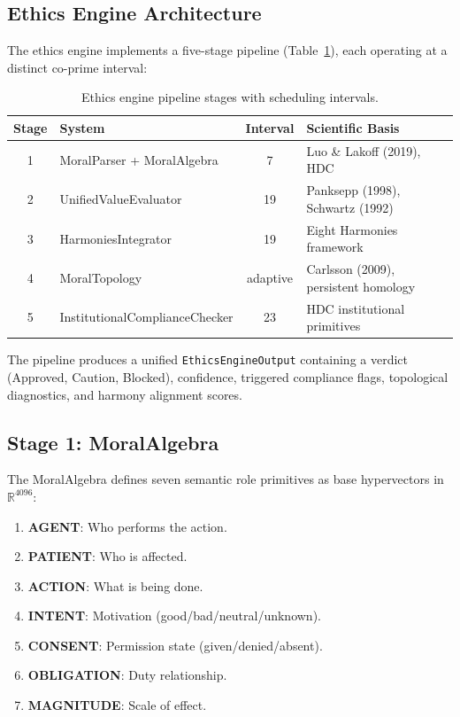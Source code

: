 \documentclass[11pt,a4paper]{article}
\begin{document}
\subsection{Ethics Engine Architecture}

The ethics engine implements a five-stage pipeline (Table~\ref{tab:pipeline}), each operating at a distinct co-prime interval:

\begin{table}[h]
\centering
\caption{Ethics engine pipeline stages with scheduling intervals.}
\label{tab:pipeline}
\begin{tabular}{clcl}
\toprule
\textbf{Stage} & \textbf{System} & \textbf{Interval} & \textbf{Scientific Basis} \\
\midrule
1 & MoralParser + MoralAlgebra & 7 & Luo \& Lakoff (2019), HDC \\
2 & UnifiedValueEvaluator & 19 & Panksepp (1998), Schwartz (1992) \\
3 & HarmoniesIntegrator & 19 & Eight Harmonies framework \\
4 & MoralTopology & adaptive & Carlsson (2009), persistent homology \\
5 & InstitutionalComplianceChecker & 23 & HDC institutional primitives \\
\bottomrule
\end{tabular}
\end{table}

The pipeline produces a unified \texttt{EthicsEngineOutput} containing a verdict (Approved, Caution, Blocked), confidence, triggered compliance flags, topological diagnostics, and harmony alignment scores.

\subsection{Stage 1: MoralAlgebra}

The MoralAlgebra defines seven semantic role primitives as base hypervectors in $\mathbb{R}^{4096}$:

\begin{enumerate}
  \item \textbf{AGENT}: Who performs the action.
  \item \textbf{PATIENT}: Who is affected.
  \item \textbf{ACTION}: What is being done.
  \item \textbf{INTENT}: Motivation (good/bad/neutral/unknown).
  \item \textbf{CONSENT}: Permission state (given/denied/absent).
  \item \textbf{OBLIGATION}: Duty relationship.
  \item \textbf{MAGNITUDE}: Scale of effect.
\end{enumerate}
\end{document}
